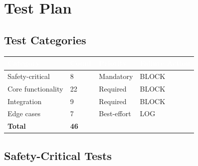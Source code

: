 \documentclass[11pt,letterpaper]{article}
\newcommand{\tableheader}[1]{\textbf{\sffamily\textcolor{white}{#1}}}
\begin{document}
\section{Test Plan}

\subsection{Test Categories}

\begin{center}
\begin{tabularx}{\textwidth}{L{4cm}C{1.5cm}C{2cm}C{2cm}}
\toprule
{}
\tableheader{Category} & \tableheader{Count} & \tableheader{Priority} & \tableheader{Failure Action} \\
\midrule
Safety-critical & 8 & Mandatory & BLOCK \\
Core functionality & 22 & Required & BLOCK \\
Integration & 9 & Required & BLOCK \\
Edge cases & 7 & Best-effort & LOG \\
\midrule
\textbf{Total} & \textbf{46} & & \\
\bottomrule
\end{tabularx}
\end{center}

\subsection{Safety-Critical Tests}
\end{document}
